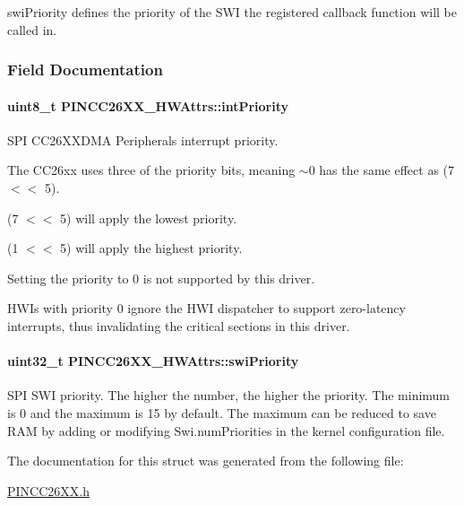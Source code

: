 swi\+Priority defines the priority of the S\+W\+I the registered callback function will be called in. 

\subsubsection{Field Documentation}
\paragraph[{int\+Priority}]{\setlength{\rightskip}{0pt plus 5cm}uint8\+\_\+t P\+I\+N\+C\+C26\+X\+X\+\_\+\+H\+W\+Attrs\+::int\+Priority}\label{struct_p_i_n_c_c26_x_x___h_w_attrs_a6e4e12f10aa905a5e6a7cf566c1dfe44}


S\+P\+I C\+C26\+X\+X\+D\+M\+A Peripheral\textquotesingle{}s interrupt priority. 

The C\+C26xx uses three of the priority bits, meaning $\sim$0 has the same effect as (7 $<$$<$ 5).

(7 $<$$<$ 5) will apply the lowest priority.

(1 $<$$<$ 5) will apply the highest priority.

Setting the priority to 0 is not supported by this driver.

H\+W\+I\textquotesingle{}s with priority 0 ignore the H\+W\+I dispatcher to support zero-\/latency interrupts, thus invalidating the critical sections in this driver. 
\paragraph[{swi\+Priority}]{\setlength{\rightskip}{0pt plus 5cm}uint32\+\_\+t P\+I\+N\+C\+C26\+X\+X\+\_\+\+H\+W\+Attrs\+::swi\+Priority}\label{struct_p_i_n_c_c26_x_x___h_w_attrs_af7aa538ec5ac9d067fd7eb9fce31f0f9}


S\+P\+I S\+W\+I priority. The higher the number, the higher the priority. The minimum is 0 and the maximum is 15 by default. The maximum can be reduced to save R\+A\+M by adding or modifying Swi.\+num\+Priorities in the kernel configuration file. 



The documentation for this struct was generated from the following file\+:\begin{DoxyCompactItemize}
\item 
\hyperlink{_p_i_n_c_c26_x_x_8h}{P\+I\+N\+C\+C26\+X\+X.\+h}\end{DoxyCompactItemize}
